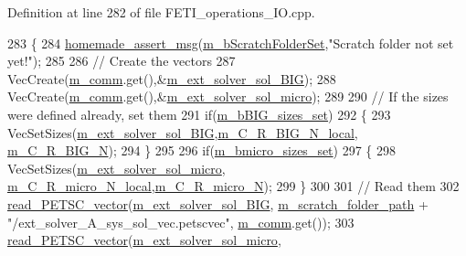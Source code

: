 Definition at line 282 of file F\+E\+T\+I\+\_\+operations\+\_\+\+I\+O.\+cpp.


\begin{DoxyCode}
283 \{
284     \hyperlink{common__header_8h_a593ccc80b790b2268653fcf6597bf451}{homemade\_assert\_msg}(\hyperlink{classcarl_1_1_f_e_t_i___operations_a8bb9de7de35a2f7d7d5982ae1085ba15}{m\_bScratchFolderSet},\textcolor{stringliteral}{"Scratch folder not set
       yet!"});
285 
286     \textcolor{comment}{// Create the vectors}
287     VecCreate(\hyperlink{classcarl_1_1_f_e_t_i___operations_a8cb0ed286667fc9f3ebc2d8ef2a3e13b}{m\_comm}.get(),&\hyperlink{classcarl_1_1_f_e_t_i___operations_a2dc346bc628b1639c0aaa9f3b0c5852d}{m\_ext\_solver\_sol\_BIG});
288     VecCreate(\hyperlink{classcarl_1_1_f_e_t_i___operations_a8cb0ed286667fc9f3ebc2d8ef2a3e13b}{m\_comm}.get(),&\hyperlink{classcarl_1_1_f_e_t_i___operations_a4e2a843baafa4a006fe429c2c82c466f}{m\_ext\_solver\_sol\_micro});
289 
290     \textcolor{comment}{// If the sizes were defined already, set them}
291     \textcolor{keywordflow}{if}(\hyperlink{classcarl_1_1_f_e_t_i___operations_a03d5022fa7da0e04b60c59c3d3cd598a}{m\_bBIG\_sizes\_set})
292     \{
293         VecSetSizes(\hyperlink{classcarl_1_1_f_e_t_i___operations_a2dc346bc628b1639c0aaa9f3b0c5852d}{m\_ext\_solver\_sol\_BIG},\hyperlink{classcarl_1_1_f_e_t_i___operations_a87856fb17203f71c386d800b1021e483}{m\_C\_R\_BIG\_N\_local},
      \hyperlink{classcarl_1_1_f_e_t_i___operations_a70409f475e309e5fbcea9be931aa321b}{m\_C\_R\_BIG\_N});
294     \}
295     
296     \textcolor{keywordflow}{if}(\hyperlink{classcarl_1_1_f_e_t_i___operations_aa3daef2d7401e0988cdea89f7ae31869}{m\_bmicro\_sizes\_set})
297     \{
298         VecSetSizes(\hyperlink{classcarl_1_1_f_e_t_i___operations_a4e2a843baafa4a006fe429c2c82c466f}{m\_ext\_solver\_sol\_micro},
      \hyperlink{classcarl_1_1_f_e_t_i___operations_a6c67394d9e538b1280b7059ff0258577}{m\_C\_R\_micro\_N\_local},\hyperlink{classcarl_1_1_f_e_t_i___operations_a067cab6ead10411079ae05a812c35d53}{m\_C\_R\_micro\_N});
299     \}
300 
301     \textcolor{comment}{// Read them}
302     \hyperlink{namespacecarl_a4d0e2c60b0765dc8182c95362c5d329a}{read\_PETSC\_vector}(\hyperlink{classcarl_1_1_f_e_t_i___operations_a2dc346bc628b1639c0aaa9f3b0c5852d}{m\_ext\_solver\_sol\_BIG},
      \hyperlink{classcarl_1_1_f_e_t_i___operations_ad6d35bc9b5221d45452fbc8931f22055}{m\_scratch\_folder\_path} + \textcolor{stringliteral}{"/ext\_solver\_A\_sys\_sol\_vec.petscvec"}, 
      \hyperlink{classcarl_1_1_f_e_t_i___operations_a8cb0ed286667fc9f3ebc2d8ef2a3e13b}{m\_comm}.get());
303     \hyperlink{namespacecarl_a4d0e2c60b0765dc8182c95362c5d329a}{read\_PETSC\_vector}(\hyperlink{classcarl_1_1_f_e_t_i___operations_a4e2a843baafa4a006fe429c2c82c466f}{m\_ext\_solver\_sol\_micro},

\end{DoxyCode}
